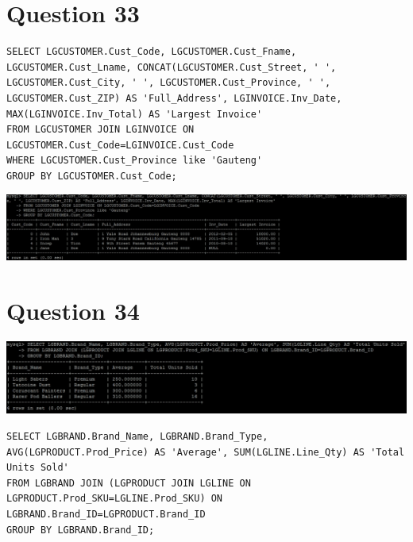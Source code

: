 \documentclass[a4paper,10pt]{article}
\begin{document}
\section {Question 33}
\lstset{
            language=SQL,
            breaklines=true
            }
        \begin{lstlisting}[frame=single]
        SELECT LGCUSTOMER.Cust_Code, LGCUSTOMER.Cust_Fname, LGCUSTOMER.Cust_Lname, CONCAT(LGCUSTOMER.Cust_Street, ' ', LGCUSTOMER.Cust_City, ' ', LGCUSTOMER.Cust_Province, ' ', LGCUSTOMER.Cust_ZIP) AS 'Full_Address', LGINVOICE.Inv_Date, MAX(LGINVOICE.Inv_Total) AS 'Largest Invoice'
FROM LGCUSTOMER JOIN LGINVOICE ON LGCUSTOMER.Cust_Code=LGINVOICE.Cust_Code
WHERE LGCUSTOMER.Cust_Province like 'Gauteng'
GROUP BY LGCUSTOMER.Cust_Code;

        \end{lstlisting}
\includegraphics{Queries/Question_33/Q33_screenshot.jpg}
\section {Question 34}
\includegraphics{Queries/Question_34/Q34_screenshot.jpg}
\lstset{
            language=SQL,
            breaklines=true
            }
        \begin{lstlisting}[frame=single]
        SELECT LGBRAND.Brand_Name, LGBRAND.Brand_Type, AVG(LGPRODUCT.Prod_Price) AS 'Average', SUM(LGLINE.Line_Qty) AS 'Total Units Sold'
FROM LGBRAND JOIN (LGPRODUCT JOIN LGLINE ON LGPRODUCT.Prod_SKU=LGLINE.Prod_SKU) ON LGBRAND.Brand_ID=LGPRODUCT.Brand_ID
GROUP BY LGBRAND.Brand_ID;

        \end{lstlisting}
\end{document}
